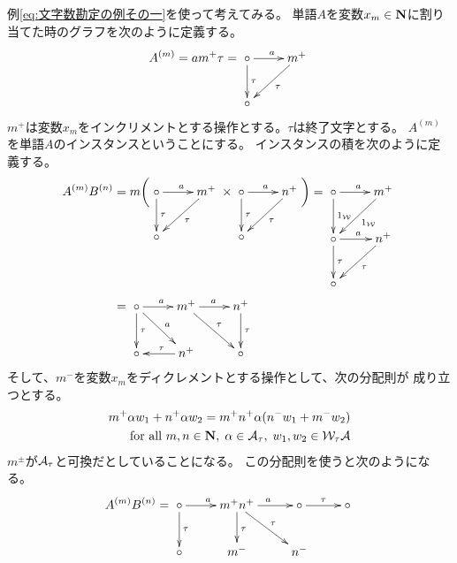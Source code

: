 {	例\eqref{eq:文字数勘定の例その一}を使って考えてみる。
	単語$A$を変数$x_m\in\mathbf{N}$に割り当てた時のグラフを次のように定義する。
	\begin{equation*}\begin{split}
		A^{(m)} = am^+\tau = \xymatrix{
			\circ \ar[d]^\tau \ar[r]^a & m^+ \ar[ld]^\tau \\
			\circ
		}
	\end{split}\end{equation*}
	$m^+$は変数$x_m$をインクリメントとする操作とする。$\tau$は終了文字とする。
	$A^{(m)}$を単語$A$のインスタンスということにする。
	インスタンスの積を次のように定義する。
	\begin{equation*}\begin{split}
		A^{(m)}B^{(n)} &= m\biggl( \xymatrix{
			\circ \ar[d]^\tau \ar[r]^a & m^+ \ar[ld]^\tau \\
			\circ
		}\times \xymatrix{
			\circ \ar[d]^\tau \ar[r]^a & n^+ \ar[ld]^\tau \\
			\circ
		} \biggr) = \xymatrix{
			\circ \ar[d]^{1_\W} \ar[r]^a & m^+ \ar[ld]^{1_\W} \\
			\circ \ar[d]^\tau \ar[r]^a & n^+ \ar[ld]^\tau \\
			\circ
		} \\
		&= \xymatrix{
			\circ \ar[d]^\tau \ar[r]^a \ar[rd]^a & m^+ \ar[rd]^\tau \ar[r]^a & n^+ \ar[d]^\tau \\
			\circ & n^+ \ar[l]_\tau & \circ \\
		}
	\end{split}\end{equation*}
	そして、$m^-$を変数$x_m$をディクレメントとする操作として、次の分配則が
	成り立つとする。
	\begin{equation*}\begin{split}
		m^+\alpha w_1 + n^+\alpha w_2 = m^+n^+\alpha (n^-w_1 + m^-w_2) \\
		\quad\text{for all }m,n\in\mathbf{N},\;\alpha\in{\ensuremath{{\mathcal{A}}}}_\tau
			,\;w_1,w_2\in{\ensuremath{{\mathcal{W}}}}_\tau{\ensuremath{{\mathcal{A}}}}
	\end{split}\end{equation*}
	$m^\pm$が${{\mathcal{A}}}_\tau$と可換だとしていることになる。
	この分配則を使うと次のようになる。
	\begin{equation*}\begin{split}
		A^{(m)}B^{(n)} &= \xymatrix{
			\circ \ar[d]^\tau \ar[r]^a & m^+n^+ \ar[d]^\tau \ar[rd]^\tau \ar[r]^a 
				& \circ \ar[r]^\tau & \circ \\
			\circ & m^- & n^- \\
		} \\

\end{split}
\end{equation*}}
